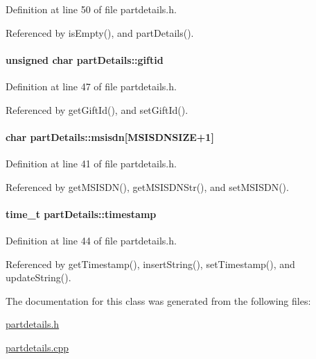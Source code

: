 Definition at line 50 of file partdetails.h.

Referenced by is\-Empty(), and part\-Details().\hypertarget{classpartDetails_partDetailso2}{
\paragraph[giftid]{\setlength{\rightskip}{0pt plus 5cm}unsigned char part\-Details::giftid}\hfill}
\label{classpartDetails_partDetailso2}




Definition at line 47 of file partdetails.h.

Referenced by get\-Gift\-Id(), and set\-Gift\-Id().\hypertarget{classpartDetails_partDetailso0}{
\paragraph[msisdn]{\setlength{\rightskip}{0pt plus 5cm}char part\-Details::msisdn\mbox{[}MSISDNSIZE+1\mbox{]}}\hfill}
\label{classpartDetails_partDetailso0}




Definition at line 41 of file partdetails.h.

Referenced by get\-MSISDN(), get\-MSISDNStr(), and set\-MSISDN().\hypertarget{classpartDetails_partDetailso1}{
\paragraph[timestamp]{\setlength{\rightskip}{0pt plus 5cm}time\_\-t part\-Details::timestamp}\hfill}
\label{classpartDetails_partDetailso1}




Definition at line 44 of file partdetails.h.

Referenced by get\-Timestamp(), insert\-String(), set\-Timestamp(), and update\-String().

The documentation for this class was generated from the following files:\begin{CompactItemize}
\item 
\hyperlink{partdetails_8h}{partdetails.h}\item 
\hyperlink{partdetails_8cpp}{partdetails.cpp}\end{CompactItemize}
